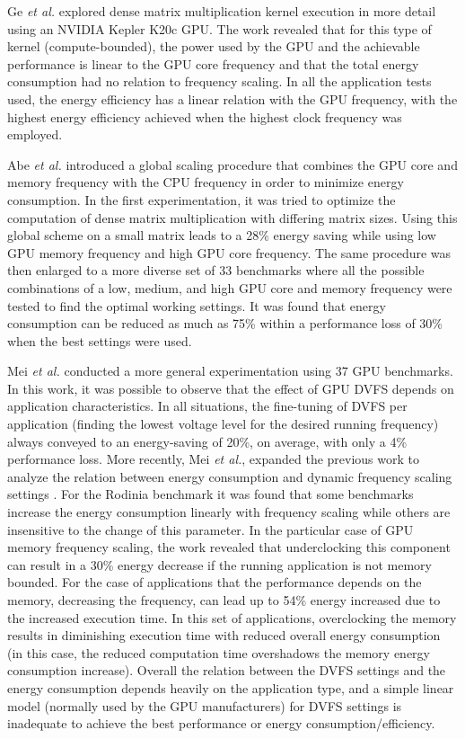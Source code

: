 Ge \textit{et al.} \cite{ge_effects_2013} explored dense matrix multiplication kernel execution in more detail using an NVIDIA Kepler K20c GPU.  The work revealed that for this type of kernel (compute-bounded), the power used by the GPU and the achievable performance is linear to the GPU core frequency and that the total energy consumption had no relation to frequency scaling. In all the application tests used, the energy efficiency has a linear relation with the GPU frequency, with the highest energy efficiency achieved when the highest clock frequency was employed.

Abe \textit{et al.} \cite{abe_power_2012} introduced a global scaling procedure that combines the GPU core and memory frequency with the CPU frequency in order to minimize energy consumption. In the first experimentation, it was tried to optimize the computation of dense matrix multiplication with differing matrix sizes. Using this global scheme on a small matrix leads to a 28\% energy saving while using low GPU memory frequency and high GPU core frequency. The same procedure was then enlarged to a more diverse set of 33 benchmarks where all the possible combinations of a low, medium, and high GPU core and memory frequency were tested to find the optimal working settings. It was found that energy consumption can be reduced as much as 75\% within a performance loss of 30\% when the best settings were used. 

Mei \textit{et al.} \cite{mei_measurement_2013} conducted a more general experimentation using 37 GPU benchmarks. In this work, it was possible to observe that the effect of GPU DVFS depends on application characteristics. In all situations, the fine-tuning of DVFS per application (finding the lowest voltage level for the desired running frequency) always conveyed to an energy-saving of 20\%, on average, with only a 4\% performance loss. More recently, Mei  \textit{et al.}, expanded the previous work to analyze the relation between energy consumption and dynamic frequency scaling settings \cite{mei_survey_2016}. For the  Rodinia benchmark \cite{che_rodinia:_2009} it was found that some benchmarks increase the energy consumption linearly with frequency scaling while others are insensitive to the change of this parameter. In the particular case of GPU memory frequency scaling, the work revealed that underclocking this component can result in a 30\% energy decrease if the running application is not memory bounded. For the case of applications that the performance depends on the memory, decreasing the frequency, can lead up to 54\% energy increased due to the increased execution time. In this set of applications, overclocking the memory results in diminishing execution time with reduced overall energy consumption (in this case, the reduced computation time overshadows the memory energy consumption increase). Overall the relation between the DVFS settings and the energy consumption depends heavily on the application type, and a simple linear model (normally used by the GPU manufacturers) for DVFS settings is inadequate to achieve the best performance or energy consumption/efficiency.



